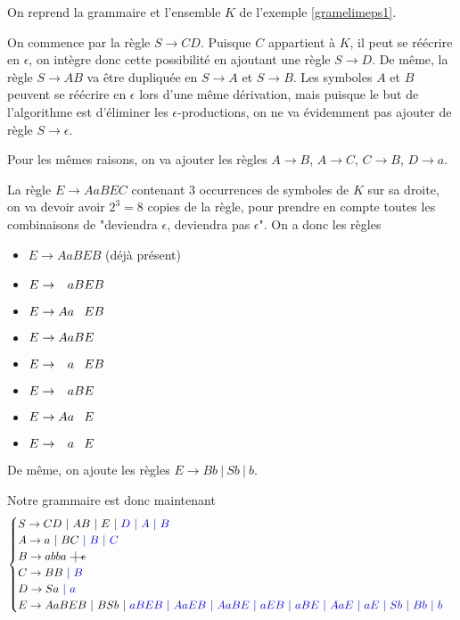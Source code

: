 \begin{example}
On reprend la grammaire et l'ensemble $K$ de l'exemple \ref{gramelimeps1}. 

On commence par la règle $S \rightarrow CD$. Puisque $C$ appartient à $K$, il peut se réécrire en $\epsilon$, on intègre donc cette possibilité en ajoutant une règle $S \rightarrow D$. De même, la règle $S \rightarrow AB$ va être dupliquée en $S \rightarrow A$ et $S \rightarrow B$. Les symboles $A$ et $B$ peuvent se réécrire en $\epsilon$ lors d'une même dérivation, mais puisque le but de l'algorithme est d'éliminer les $\epsilon$-productions, on ne va évidemment pas ajouter de règle $S \rightarrow \epsilon$.

Pour les mêmes raisons, on va ajouter les règles $A \rightarrow B$, $A \rightarrow C$, $C \rightarrow B$, $D \rightarrow a$. 

La règle $E \rightarrow AaBEC$ contenant 3 occurrences de symboles de $K$ sur sa droite, on va devoir avoir $2^3 = 8$ copies de la règle, pour prendre en compte toutes les combinaisons de "deviendra $\epsilon$, deviendra pas $\epsilon$". On a donc les règles 

\begin{itemize}
\item[] $E \rightarrow AaBEB$ (déjà présent)
\item[] $E \rightarrow \textcolor{white}{A}aBEB$
\item[] $E \rightarrow Aa\textcolor{white}{B}EB$
\item[] $E \rightarrow AaBE\textcolor{white}{B}$
\item[] $E \rightarrow \textcolor{white}{A}a\textcolor{white}{B}EB$
\item[] $E \rightarrow \textcolor{white}{A}aBE\textcolor{white}{B}$
\item[] $E \rightarrow Aa\textcolor{white}{B}E\textcolor{white}{B}$
\item[] $E \rightarrow \textcolor{white}{A}a\textcolor{white}{B}E\textcolor{white}{B}$
\end{itemize}

De même, on ajoute les règles $E \rightarrow Bb~|~Sb~|~b$.

Notre grammaire est donc maintenant 
\[
\begin{cases}
S \rightarrow CD~|~AB~|~E\textcolor{blue}{~|~D~|~A~|~B} \\
A \rightarrow a~|~BC\textcolor{blue}{~|~B~|~C} \\
B \rightarrow abba~\text{\st{$~|~\epsilon$}}\\
C \rightarrow BB\textcolor{blue}{~|~B} \\
D \rightarrow Sa\textcolor{blue}{~|~ a} \\
E \rightarrow AaBEB~|~BSb~|~\textcolor{blue}{aBEB~|~AaEB~|~AaBE~|~aEB~|~aBE~|~AaE~|~aE~|~Sb~|~Bb~|~b}
\end{cases}
\]

\end{example}


